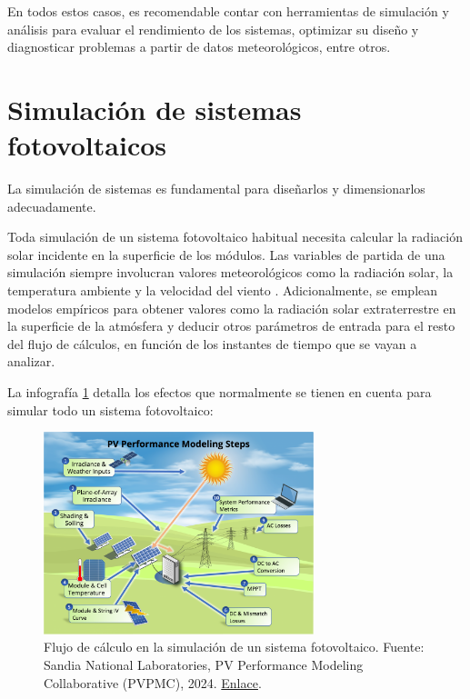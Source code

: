 En todos estos casos, es recomendable contar con herramientas de simulación y análisis para evaluar el rendimiento de los sistemas, optimizar su diseño y diagnosticar problemas a partir de datos meteorológicos, entre otros.

\section{Simulación de sistemas fotovoltaicos} \label{sct:simulaciones}

La \gls{simulación} de sistemas es fundamental para diseñarlos y dimensionarlos adecuadamente.

Toda simulación de un \gls{sistema fotovoltaico} habitual necesita calcular la radiación solar incidente en la superficie de los módulos. Las variables de partida de una simulación siempre involucran valores meteorológicos como la radiación solar, la temperatura ambiente y la velocidad del viento \cite{Perpinan2020}. Adicionalmente, se emplean modelos empíricos para obtener valores como la radiación solar extraterrestre en la superficie de la atmósfera y deducir otros parámetros de entrada para el resto del flujo de cálculos, en función de los instantes de tiempo que se vayan a analizar.

La infografía \ref{fig:pv_simulation_flow} detalla los efectos que normalmente se tienen en cuenta para simular todo un sistema fotovoltaico:

\begin{figure}[H]
      \centering
      \includegraphics[width=0.7\textwidth]{./images/SoA_irrad/pv_simulation_flow.png}
      \caption{Flujo de cálculo en la simulación de un sistema fotovoltaico. Fuente: Sandia National Laboratories, PV Performance Modeling Collaborative (PVPMC), 2024. \href{https://pvpmc.sandia.gov/}{Enlace}.}
      \label{fig:pv_simulation_flow}
\end{figure}

